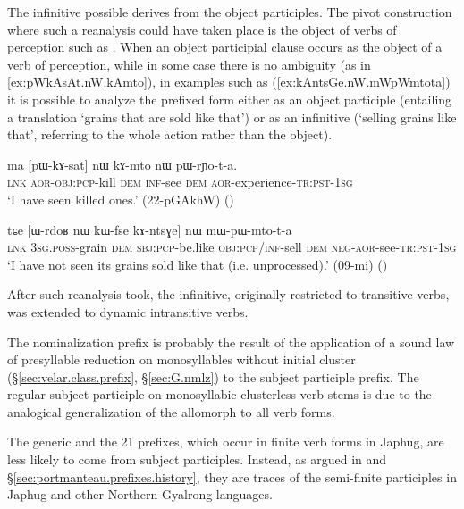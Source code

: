The  infinitive possible derives from the object participles. The pivot construction where such a reanalysis could have taken place is the object of verbs of perception such as . When an object participial clause occurs as the object of a verb of perception, while in some case there is no ambiguity (as in \ref{ex:pWkAsAt.nW.kAmto}), in examples such as (\ref{ex:kAntsGe.nW.mWpWmtota}) it is possible to analyze the  prefixed form either as an object participle (entailing a translation `grains that are sold like that') or as an infinitive (`selling grains like that', referring to the whole action rather than the object).

\begin{exe}
\ex \label{ex:pWkAsAt.nW.kAmto} 
\gll ma [pɯ-kɤ-sat] nɯ kɤ-mto nɯ pɯ-rɲo-t-a. \\
\textsc{lnk} \textsc{aor}-\textsc{obj}:\textsc{pcp}-kill \textsc{dem} \textsc{inf}-see \textsc{dem} \textsc{aor}-experience-\textsc{tr}:\textsc{pst}-\textsc{1sg} \\
\glt `I have seen killed ones.' (22-pGAkhW)
()
\end{exe}

\begin{exe}
\ex \label{ex:kAntsGe.nW.mWpWmtota} 
\gll tɕe [ɯ-rdoʁ nɯ kɯ-fse kɤ-ntsɣe] nɯ mɯ-pɯ-mto-t-a \\
\textsc{lnk} \textsc{3sg}.\textsc{poss}-grain \textsc{dem} \textsc{sbj}:\textsc{pcp}-be.like \textsc{obj}:\textsc{pcp}/\textsc{inf}-sell \textsc{dem} \textsc{neg}-\textsc{aor}-see-\textsc{tr}:\textsc{pst}-\textsc{1sg} \\
\glt `I have not seen its grains sold like that (i.e. unprocessed).' (09-mi) ()
\end{exe}

After such reanalysis took, the  infinitive, originally restricted to transitive verbs, was extended to dynamic intransitive verbs. 

The nominalization  prefix is probably the result of the application of a sound law of presyllable reduction on monosyllables without initial cluster (§\ref{sec:velar.class.prefix}, §\ref{sec:G.nmlz}) to the subject participle prefix. The regular  subject participle on monosyllabic clusterless verb stems is due to the analogical generalization of the  allomorph to all verb forms.

The generic  and the 2\fl{}1  prefixes, which occur in finite verb forms in Japhug, are less likely to come from subject participles. Instead, as argued in \citet{jacques18generic} and §\ref{sec:portmanteau.prefixes.history}, they are traces of the semi-finite participles in Japhug and other Northern Gyalrong languages.

